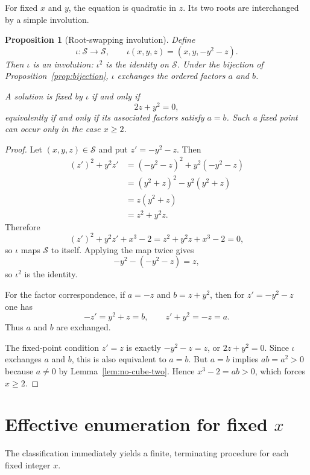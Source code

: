 \documentclass[11pt,a4paper]{article}
\newtheorem{proposition}[theorem]{Proposition}
\theoremstyle{definition}
\theoremstyle{remark}
\newcommand{\Sols}{\mathscr S}
\begin{document}
For fixed $x$ and $y$, the equation is quadratic in $z$.  Its two roots are
interchanged by a simple involution.

\begin{proposition}[Root-swapping involution]\label{prop:involution}
Define
\[
 \iota:\Sols\longrightarrow\Sols,
 \qquad
 \iota(x,y,z)=(x,y,-y^2-z).
\]
Then $\iota$ is an involution: $\iota^2$ is the identity on $\Sols$.
Under the bijection of Proposition~\ref{prop:bijection}, $\iota$ exchanges the
ordered factors $a$ and $b$.

A solution is fixed by $\iota$ if and only if
\[
 2z+y^2=0,
\]
equivalently if and only if its associated factors satisfy $a=b$.
Such a fixed point can occur only in the case $x\geq2$.
\end{proposition}

\begin{proof}
Let $(x,y,z)\in\Sols$ and put $z'=-y^2-z$.  Then
\begin{align*}
 (z')^2+y^2z'
 &=(-y^2-z)^2+y^2(-y^2-z)\\
 &=(y^2+z)^2-y^2(y^2+z)\\
 &=z(y^2+z)\\
 &=z^2+y^2z.
\end{align*}
Therefore
\[
 (z')^2+y^2z'+x^3-2
 =z^2+y^2z+x^3-2
 =0,
\]
so $\iota$ maps $\Sols$ to itself.  Applying the map twice gives
\[
 -y^2-(-y^2-z)=z,
\]
so $\iota^2$ is the identity.

For the factor correspondence, if
$a=-z$ and $b=z+y^2$, then for $z'=-y^2-z$ one has
\[
 -z'=y^2+z=b,
 \qquad
 z'+y^2=-z=a.
\]
Thus $a$ and $b$ are exchanged.

The fixed-point condition $z' = z$ is exactly
$-y^2-z=z$, or $2z+y^2=0$.  Since $\iota$ exchanges $a$ and $b$, this is also
equivalent to $a=b$.  But $a=b$ implies $ab=a^2>0$ because
$a\neq0$ by Lemma~\ref{lem:no-cube-two}.  Hence $x^3-2=ab>0$, which forces
$x\geq2$.
\end{proof}

\section{Effective enumeration for fixed \texorpdfstring{$x$}{x}}

The classification immediately yields a finite, terminating procedure for
each fixed integer $x$.
\end{document}
